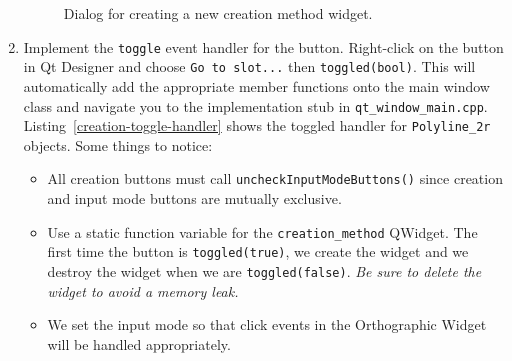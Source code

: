 \begin{enumerate}
\begin{figure}[htb]
	\centering
	\caption{Dialog for creating a new creation method widget.} 
	\label{fig:creation-method}
  \end{figure}
  \item Implement the \texttt{toggle} event handler for the button. Right-click
  on the button in Qt Designer and choose \texttt{Go to slot...} then
  \texttt{toggled(bool)}. This will automatically add the appropriate member
  functions onto the main window class and navigate you to the implementation
  stub in \texttt{qt\_window\_main.cpp}. Listing~\ref{creation-toggle-handler}
  shows the toggled handler for \texttt{Polyline\_2r} objects. Some things to notice:
  
  \begin{itemize}
    \item All creation buttons must call \texttt{uncheckInputModeButtons()}
    since creation and input mode buttons are mutually exclusive.
    \item Use a static function variable for the \texttt{creation\_method}
    QWidget. The first time the button is \texttt{toggled(true)}, we create the
    widget and we destroy the widget when we are \texttt{toggled(false)}.
    \emph{Be sure to delete the widget to avoid a memory leak.}
    \item We set the input mode so that click events in the Orthographic Widget
    will be handled appropriately.
  \end{itemize}
\end{enumerate}




